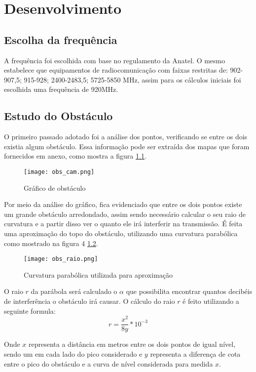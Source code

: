 \chapter{Desenvolvimento}\label{cap:CnptDsng}

\section{Escolha da frequência}\label{sec:esc_freq}
A frequência foi escolhida com base no regulamento da Anatel. O mesmo estabelece que equipamentos de radiocomunicação com faixas restritas de: 902-907,5; 915-928; 2400-2483,5; 5725-5850 MHz, assim para os cálculos iniciais foi escolhida uma frequência de 920MHz.

\section{Estudo do Obstáculo}\label{sec:est_obs}
O primeiro passado adotado foi a análise dos pontos, verificando se entre os dois existia algum obstáculo. Essa informação pode ser extraída dos mapas que foram fornecidos em anexo, como mostra a figura \ref{fig:obs_cam}.
\begin{figure}[h]
	\centering
	\texttt{[image: obs\_cam.png]}
	\caption{Gráfico de obstáculo}
	\label{fig:obs_cam}
\end{figure} 

Por meio da análise do gráfico, fica evidenciado que entre os dois pontos existe um grande obstáculo arredondado, assim sendo necessário calcular o seu raio de curvatura e a partir disso ver o quanto ele irá interferir na transmissão.
É feita uma aproximação do topo do obstáculo, utilizando uma curvatura parabólica como mostrado na figura 4 \ref{fig:obs_raio}.
\begin{figure}[h]
	\centering
	\texttt{[image: obs\_raio.png]}
	\label{fig:obs_raio}
	\caption{Curvatura parabólica utilizada para aproximação}
\end{figure} 

O raio $r$ da parábola será calculado o $\alpha$ que possibilita encontrar quantos decibéis de interferência o obstáculo irá causar. O cálculo do raio $r$ é feito utilizando a seguinte formula:
\begin{equation}
r = \dfrac{x^2}{8y}*10^{-3}
\end{equation}

Onde $x$ representa a distância em metros entre os dois pontos de igual nível, sendo um em cada lado do pico considerado e $y$ representa a diferença de cota entre o pico do obstáculo e a curva de nível considerada para  medida $x$.

